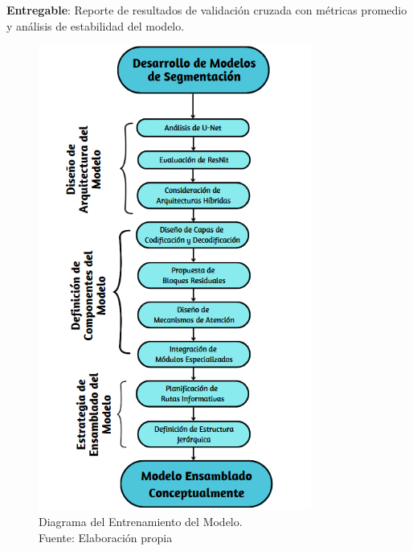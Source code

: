  \textbf{Entregable}: Reporte de resultados de validación cruzada con métricas promedio y análisis de estabilidad del modelo.

 \begin{figure}[h]
    \begin{center}
        \includegraphics[width=0.8\textwidth]{3/figures/Diagrama de Desarrollo.png}
        \caption[Diagrama del Entrenamiento del Modelo]{Diagrama del Entrenamiento del Modelo.\\
        Fuente: Elaboración propia}
        \label{3:fig6}
    \end{center}
\end{figure}

